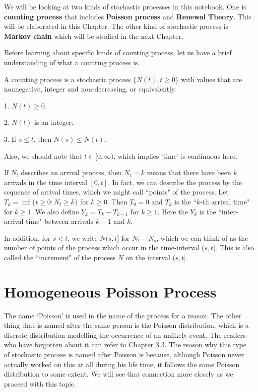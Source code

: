\documentclass[11pt, a4paper, oneside]{book}
\theoremstyle{definition}
\def\cprocess{\{N(t), t\ge 0\}}
\begin{document}
\noindent We will be looking at two kinds of stochastic processes in this notebook. One is \textbf{counting process} that includes \textbf{Poisson process} and \textbf{Renewal Theory}. This will be elaborated in this Chapter. The other kind of stochastic process is \textbf{Markov chain} which will be studied in the next Chapter. 

\noindent Before learning about specific kinds of counting process, let us have a brief understanding of what a counting process is. 

\noindent A counting process is a stochastic process $\cprocess$ with values that are nonnegative, integer and non-decreasing, or equivalently:

1. $N(t) \ge 0$.

2. $N(t)$ is an integer.

3. If $s \le t$, then $N(s) \le N(t)$.

\noindent Also, we should note that $t \in [0,\infty )$, which implies `time' is continuous here. 

\noindent If $N_t$ describes an arrival process, then $N_t = k$ means that there have been $k$ arrivals in the time interval $[0,t]$. In fact, we can describe the process by the sequence of arrival times, which we might call ``points" of the process. Let $T_k = \inf\{t\ge 0: N_t \ge k\}$ for $k \ge 0$. Then $T_0 = 0$ and $T_k$ is the ``$k$-th arrival time" for $k \ge 1$. We also define $Y_k = T_k - T_{k-1}$ for $k \ge 1$. Here the $Y_k$ is the ``inter-arrival time" between arrivals $k-1$ and $k$. 

\noindent In addition, for $s < t$, we write $N(s,t]$ for $N_t - N_s$, which we can think of as the number of points of the process which occur in the time-interval $(s,t]$. This is also called the ``increment" of the process $N$ on the interval $(s,t]$. 

\section{Homogeneous Poisson Process}

\noindent The name `Poisson' is used in the name of the process for a reason. The other thing that is named after the same person is the Poisson distribution, which is a discrete distribution modelling the occurrence of an unlikely event. The readers who have forgotten about it can refer to Chapter 3.3. The reason why this type of stochastic process is named after Poisson is because, although Poisson never actually worked on this at all during his life time, it follows the same Poisson distribution to some extent. We will see that connection more closely as we proceed with this topic. 
\end{document}
